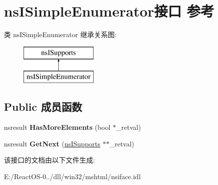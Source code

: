 \hypertarget{interfacens_i_simple_enumerator}{}\section{ns\+I\+Simple\+Enumerator接口 参考}
\label{interfacens_i_simple_enumerator}
类 ns\+I\+Simple\+Enumerator 继承关系图\+:\begin{figure}[H]
\begin{center}
\leavevmode
\includegraphics[height=2.000000cm]{interfacens_i_simple_enumerator}
\end{center}
\end{figure}
\subsection*{Public 成员函数}
\begin{DoxyCompactItemize}
\item 
\mbox{\label{interfacens_i_simple_enumerator_a11cbb7a6b61ccf8be1362de6a24f3df1}} 
nsresult {\bfseries Has\+More\+Elements} (bool $\ast$\+\_\+retval)
\item 
\mbox{\label{interfacens_i_simple_enumerator_a494caf2e805b3e05586b12de1b043f36}} 
nsresult {\bfseries Get\+Next} (\hyperlink{interfacens_i_supports}{ns\+I\+Supports} $\ast$$\ast$\+\_\+retval)
\end{DoxyCompactItemize}


该接口的文档由以下文件生成\+:\begin{DoxyCompactItemize}
\item 
E\+:/\+React\+O\+S-\/0../dll/win32/mshtml/nsiface.\+idl\end{DoxyCompactItemize}
